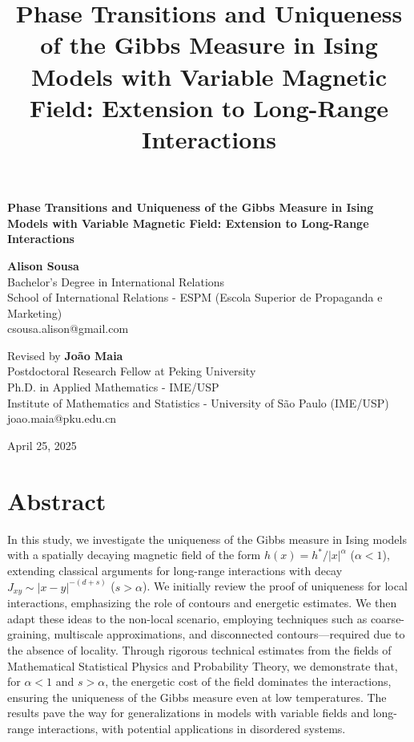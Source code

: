\documentclass{article}
\title{Phase Transitions and Uniqueness of the Gibbs Measure in Ising Models with Variable Magnetic Field: Extension to Long-Range Interactions}
\author{}
\date{}
\begin{document}
\fontsize{12pt}{18pt}\selectfont

\begin{center}
{\LARGE \textbf{Phase Transitions and Uniqueness of the Gibbs Measure in Ising Models with Variable Magnetic Field: Extension to Long-Range Interactions}}

\vspace{1cm}

\textbf{Alison Sousa}\\
Bachelor's Degree in International Relations\\
School of International Relations - ESPM (Escola Superior de Propaganda e Marketing)\\
csousa.alison@gmail.com

\vspace{0.5cm}

Revised by \textbf{João Maia}\\
Postdoctoral Research Fellow at Peking University\\
Ph.D. in Applied Mathematics - IME/USP\\
Institute of Mathematics and Statistics - University of São Paulo (IME/USP)\\
joao.maia@pku.edu.cn

\vspace{1cm}

April 25, 2025
\end{center}

\thispagestyle{empty} %

\newpage

\section*{Abstract}
In this study, we investigate the uniqueness of the Gibbs measure in Ising models with a spatially decaying magnetic field of the form $h(x) = h^*/|x|^\alpha$ ($\alpha<1$), extending classical arguments for long-range interactions with decay $J_{xy} \sim |x-y|^{-(d+s)}$ ($s>\alpha$). We initially review the proof of uniqueness for local interactions, emphasizing the role of contours and energetic estimates. We then adapt these ideas to the non-local scenario, employing techniques such as coarse-graining, multiscale approximations, and disconnected contours---required due to the absence of locality. Through rigorous technical estimates from the fields of Mathematical Statistical Physics and Probability Theory, we demonstrate that, for $\alpha<1$ and $s>\alpha$, the energetic cost of the field dominates the interactions, ensuring the uniqueness of the Gibbs measure even at low temperatures. The results pave the way for generalizations in models with variable fields and long-range interactions, with potential applications in disordered systems.
\end{document}
